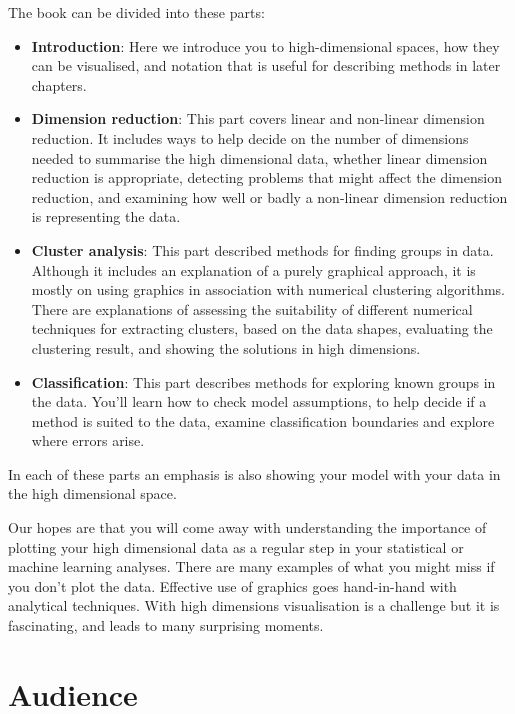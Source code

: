 \documentclass[
  letterpaper,
]{krantz}
\providecommand{\tightlist}{%
  \setlength{\itemsep}{0pt}\setlength{\parskip}{0pt}}\usepackage{longtable,booktabs,array}
\begin{document}
The book can be divided into these parts:

\begin{itemize}
\tightlist
\item
  \textbf{Introduction}: Here we introduce you to high-dimensional
  spaces, how they can be visualised, and notation that is useful for
  describing methods in later chapters.\\
\item
  \textbf{Dimension reduction}: This part covers linear and non-linear
  dimension reduction. It includes ways to help decide on the number of
  dimensions needed to summarise the high dimensional data, whether
  linear dimension reduction is appropriate, detecting problems that
  might affect the dimension reduction, and examining how well or badly
  a non-linear dimension reduction is representing the data.
\item
  \textbf{Cluster analysis}: This part described methods for finding
  groups in data. Although it includes an explanation of a purely
  graphical approach, it is mostly on using graphics in association with
  numerical clustering algorithms. There are explanations of assessing
  the suitability of different numerical techniques for extracting
  clusters, based on the data shapes, evaluating the clustering result,
  and showing the solutions in high dimensions.
\item
  \textbf{Classification}: This part describes methods for exploring
  known groups in the data. You'll learn how to check model assumptions,
  to help decide if a method is suited to the data, examine
  classification boundaries and explore where errors arise.
\end{itemize}

In each of these parts an emphasis is also showing your model with your
data in the high dimensional space.

Our hopes are that you will come away with understanding the importance
of plotting your high dimensional data as a regular step in your
statistical or machine learning analyses. There are many examples of
what you might miss if you don't plot the data. Effective use of
graphics goes hand-in-hand with analytical techniques. With high
dimensions visualisation is a challenge but it is fascinating, and leads
to many surprising moments.

\section*{Audience}\label{audience}
\end{document}
